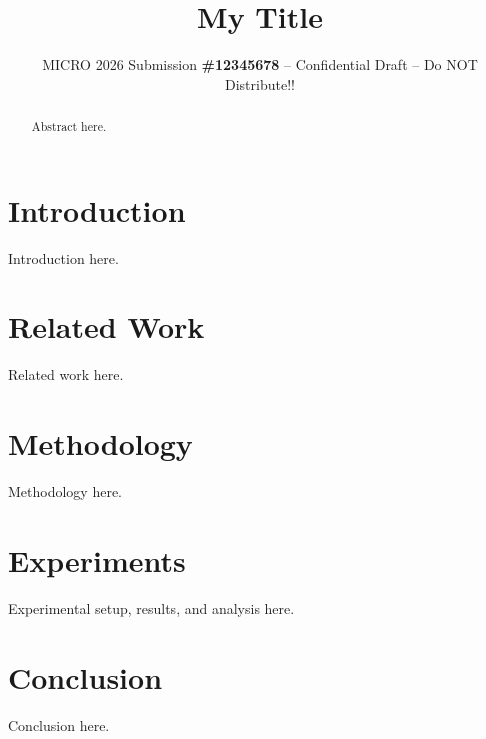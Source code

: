 \documentclass[sigconf, screen, review]{acmart}
\begin{document}
\title{My Title}
\subtitle{\normalsize{MICRO 2026 Submission
    \textbf{\#12345678} -- Confidential Draft -- Do NOT Distribute!!}}

\begin{abstract}
Abstract here.
\end{abstract}


\maketitle

\section{Introduction}
\label{sec:intro}
Introduction here.

\section{Related Work}
\label{sec:related_work}
Related work here.

\section{Methodology}
\label{sec:method}
Methodology here.

\section{Experiments}
\label{sec:experiments}
Experimental setup, results, and analysis here.

\section{Conclusion}
\label{sec:conclusion}
Conclusion here.




\end{document}
